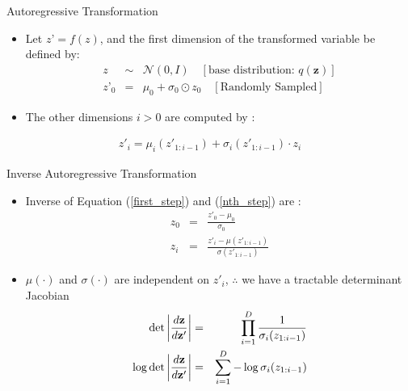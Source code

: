 \documentclass{beamer}
\begin{document}
\begin{frame}{Autoregressive Transformation}
\begin{itemize}
    \item Let $z’ = f(z)$, and the first dimension of the transformed variable be defined by:
    \begin{eqnarray}
    z &\sim& \mathcal{N}(0, I) \quad [\text{base distribution: } q(\mathbf{z})] \\
    z’_0 &=& \mu_0 + \sigma_0 \odot z_0 \quad [\text{Randomly Sampled}]  \label{first_step}
    \end{eqnarray}
    \pause
    \item The other dimensions $i>0$ are computed by :
\end{itemize}
\begin{eqnarray}
z'_i = \mu_i(z'_{1:i-1}) + \sigma_i(z'_{1:i-1}) \cdot z_i \label{nth_step}
\end{eqnarray}
    
\end{frame}
\begin{frame}{Inverse Autoregressive Transformation}
\begin{itemize}
    \item Inverse of Equation  (\ref{first_step}) and (\ref{nth_step}) are :
    \begin{eqnarray}
    z_0 &=& \frac{z'_0 - \mu_0}{\sigma_0} \label{iart0} \\
    z_i &=& \frac{z'_i - \mu(z'_{1:i-1}) }{\sigma(z'_{1:i-1})} \label{iart}
    \end{eqnarray}
    \pause
    \item $\mu(\cdot)$ and $\sigma(\cdot)$ are independent on $z'_i$, $\therefore$ we have a tractable determinant Jacobian
    \pause
    \begin{eqnarray}
    \det \left| \frac{d{\bf z}}{d{\bf z'}} \right| &=& \prod_{i=1}^D  \frac{1}{\sigma_i(z_{1:i-1})} \\
    \log \det \left| \frac{d{\bf z}}{d{\bf z'}} \right| &=& \sum_{i=1}^D - \log \sigma_i(z_{1:i-1})
    \end{eqnarray}
\end{itemize}
\end{frame}
\end{document}

